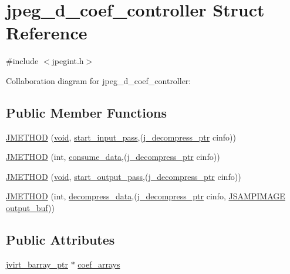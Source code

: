 \hypertarget{structjpeg__d__coef__controller}{}\section{jpeg\+\_\+d\+\_\+coef\+\_\+controller Struct Reference}
\label{structjpeg__d__coef__controller}


{\ttfamily \#include $<$jpegint.\+h$>$}



Collaboration diagram for jpeg\+\_\+d\+\_\+coef\+\_\+controller\+:
\subsection*{Public Member Functions}
\begin{DoxyCompactItemize}
\item 
\hyperlink{structjpeg__d__coef__controller_ab4b18cfac761c7186363a845e36f342c}{J\+M\+E\+T\+H\+O\+D} (\hyperlink{png_8h_aa8c59027f9ab2769342f248709d68d17}{void}, \hyperlink{jdinput_8c_abc0a94e24edf93bc7f914cf4a698a870}{start\+\_\+input\+\_\+pass},(\hyperlink{jpeglib_8h_a00c7d78af44bd26a901c791ccfc1e178}{j\+\_\+decompress\+\_\+ptr} cinfo))
\item 
\hyperlink{structjpeg__d__coef__controller_a4c0e8d307e0852eae338a0f4f3c96edb}{J\+M\+E\+T\+H\+O\+D} (int, \hyperlink{jdcoefct_8c_a474c99ffcdc94688233e34f65e95c50d}{consume\+\_\+data},(\hyperlink{jpeglib_8h_a00c7d78af44bd26a901c791ccfc1e178}{j\+\_\+decompress\+\_\+ptr} cinfo))
\item 
\hyperlink{structjpeg__d__coef__controller_addb7a363607be97630bf37175267fd58}{J\+M\+E\+T\+H\+O\+D} (\hyperlink{png_8h_aa8c59027f9ab2769342f248709d68d17}{void}, \hyperlink{jdcoefct_8c_adf23b9a09770b5e038955fa770f95060}{start\+\_\+output\+\_\+pass},(\hyperlink{jpeglib_8h_a00c7d78af44bd26a901c791ccfc1e178}{j\+\_\+decompress\+\_\+ptr} cinfo))
\item 
\hyperlink{structjpeg__d__coef__controller_a5d61ba56d9f5d8de0662df091aa6d9e1}{J\+M\+E\+T\+H\+O\+D} (int, \hyperlink{jdcoefct_8c_aeb3959a425ae15d61d141f82da1087aa}{decompress\+\_\+data},(\hyperlink{jpeglib_8h_a00c7d78af44bd26a901c791ccfc1e178}{j\+\_\+decompress\+\_\+ptr} cinfo, \hyperlink{jpeglib_8h_a4bf858e4d42202287e786bdec2f3b62b}{J\+S\+A\+M\+P\+I\+M\+A\+G\+E} \hyperlink{jdct_8h_ad7e4660a191b1a791748dd44d5a7a0ec}{output\+\_\+buf}))
\end{DoxyCompactItemize}
\subsection*{Public Attributes}
\begin{DoxyCompactItemize}
\item 
\hyperlink{jpeglib_8h_a994f4cba141d82ded90af38e51223f0b}{jvirt\+\_\+barray\+\_\+ptr} $\ast$ \hyperlink{structjpeg__d__coef__controller_a6611f9e18fbbbb13d117caadb5d14dc1}{coef\+\_\+arrays}
\end{DoxyCompactItemize}


